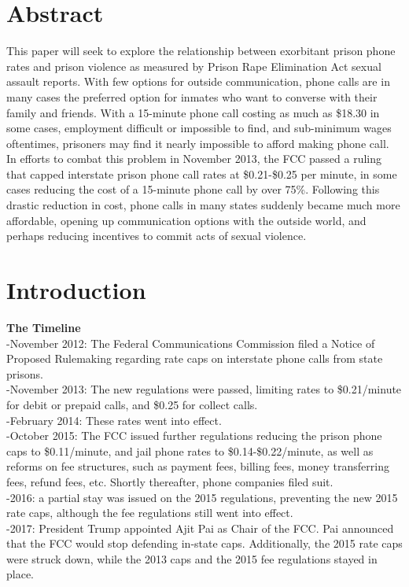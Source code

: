 \documentclass[10pt,a4paper]{article}
\begin{document}
\section{Abstract}
This paper will seek to explore the relationship between exorbitant prison phone rates and prison violence as measured by Prison Rape Elimination Act sexual assault reports. With few options for outside communication, phone calls are in many cases the preferred option for inmates who want to converse with their family and friends. With a 15-minute phone call costing as much as \$18.30 in some cases, employment difficult or impossible to find, and sub-minimum wages oftentimes, prisoners may find it nearly impossible to afford making phone call. In efforts to combat this problem in November 2013, the FCC passed a ruling that capped interstate prison phone call rates at \$0.21-\$0.25 per minute, in some cases reducing the cost of a 15-minute phone call by over 75\%. Following this drastic reduction in cost, phone calls in many states suddenly became much more affordable, opening up communication options with the outside world, and perhaps reducing incentives to commit acts of sexual violence. \\





\section{Introduction}
\noindent \textbf{The Timeline} \\
-November 2012: The Federal Communications Commission filed a Notice of Proposed Rulemaking regarding rate caps on interstate phone calls from state prisons. \\
-November 2013: The new regulations were passed, limiting rates to \$0.21/minute for debit or prepaid calls, and \$0.25 for collect calls. \\
-February 2014: These rates went into effect. \\
-October 2015: The FCC issued further regulations reducing the prison phone caps to \$0.11/minute, and jail phone rates to \$0.14-\$0.22/minute, as well as reforms on fee structures, such as payment fees, billing fees, money transferring fees, refund fees, etc. Shortly thereafter, phone companies filed suit. \\
-2016: a partial stay was issued on the 2015 regulations, preventing the new 2015 rate caps, although the fee regulations still went into effect. \\
-2017: President Trump appointed Ajit Pai as Chair of the FCC. Pai announced that the FCC would stop defending in-state caps. Additionally, the 2015 rate caps were struck down, while the 2013 caps and the 2015 fee regulations stayed in place. \\
\end{document}
